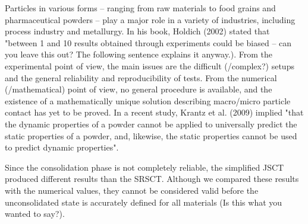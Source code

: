 Particles in various forms – ranging from raw materials to food grains and pharmaceutical powders – play a major role in a variety of industries, including process industry and metallurgy. In his book, Holdich (2002) stated that "between 1 and 10%
results obtained through experiments could be biased – can you leave this out? The following sentence explains it anyway.). From the experimental point of view, the main issues are the difficult (/complex?) setups and the general reliability and reproducibility of tests. From the numerical (/mathematical) point of view, no general procedure is available, and the existence of a mathematically unique solution describing macro/micro particle contact has yet  to be proved. In a recent study, Krantz et al. (2009) implied "that the dynamic properties of a powder cannot be applied to universally predict the static properties of a powder, and, likewise, the static properties cannot be used to predict dynamic properties".


Since the consolidation phase is not completely reliable, the simplified JSCT produced different \mpsh results than the SRSCT. Although we compared these results with the numerical values, they cannot be considered valid before the unconsolidated state is accurately defined for all materials (Is this what you wanted to say?).